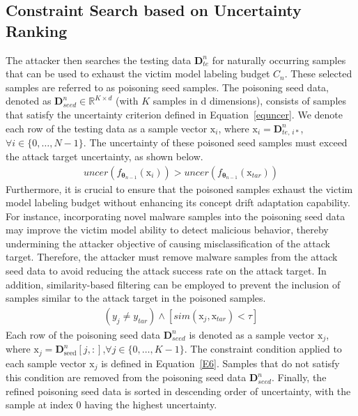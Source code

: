 \documentclass[conference,compsoc]{IEEEtran} %
\begin{document}
\subsection{Constraint Search based on Uncertainty Ranking}
The attacker then searches the testing data $\bm{D}_{te}^{n}$ for naturally occurring samples that can be used to exhaust the victim model  labeling budget $C_{n}$.
These selected samples are referred to as poisoning seed samples.
The poisoning seed data, denoted as $\bm{D}_{seed}^{n} \in \mathbb{R}^{K \times d}$ (with $K$ samples in d dimensions), consists of samples that satisfy the uncertainty criterion defined in Equation~\ref{equncer}.
We denote each row of the testing data as a sample vector $\bm{\mathrm{x}}_{i}$, where $\bm{\mathrm{x}}_{i} = \bm{D}_{te,\,i*}^{n}$,$\forall i \in \{0, \dots, N-1\}$.
The uncertainty of these poisoned seed samples must exceed the attack target  uncertainty, as shown below.
\begin{equation}
	\begin{aligned}
		uncer(f_{\bm{\theta}_{n-1}} \left( \bm{\mathrm{x}}_{i} \right)) > uncer(f_{\bm{\theta}_{n-1}} \left( \bm{\mathrm{x}}_{tar} \right))
	\end{aligned}
	\label{equncer}
\end{equation}
Furthermore, it is crucial to ensure that the poisoned samples exhaust the victim model  labeling budget without enhancing its concept drift adaptation capability.
For instance, incorporating novel malware samples into the poisoning seed data may improve the victim model  ability to detect malicious behavior, thereby undermining the attacker  objective of causing misclassification of the attack target.
Therefore, the attacker must remove malware samples from the attack seed data to avoid reducing the attack success rate on the attack target.
In addition, similarity-based filtering can be employed to prevent the inclusion of samples similar to the attack target in the poisoned samples.
\begin{equation}
	\begin{aligned}
		(y_{j} \neq y_{tar}) \land [sim(\bm{\mathrm{x}}_{j},\bm{\mathrm{x}}_{tar})< \tau]
	\end{aligned}
	\label{E6}
\end{equation}
Each row of the poisoning seed data $\bm{D}_{seed}^{n}$ is denoted as a sample vector $\bm{\mathrm{x}}_{j}$, where $\bm{\mathrm{x}}_{j} = \bm{D}_{\text{seed}}^{n}[j,:]$,$\forall j \in \{0, \dots, K-1\}$.
The constraint condition applied to each sample vector $\bm{\mathrm{x}}_{j}$ is defined in Equation~\ref{E6}.
Samples that do not satisfy this condition are removed from the poisoning seed data $\bm{D}_{seed}^{n}$.
Finally, the refined poisoning seed data is sorted in descending order of uncertainty, with the sample at index 0 having the highest uncertainty.
\end{document}
